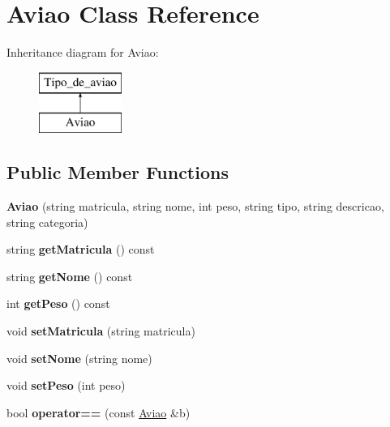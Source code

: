 \hypertarget{class_aviao}{
\section{Aviao Class Reference}
\label{class_aviao}
}
Inheritance diagram for Aviao:\begin{figure}[H]
\begin{center}
\leavevmode
\includegraphics[height=2.000000cm]{class_aviao}
\end{center}
\end{figure}
\subsection*{Public Member Functions}
\begin{DoxyCompactItemize}
\item 
\hypertarget{class_aviao_a5df6f09b98334b6a17c11d2bc78ef5f3}{
{\bfseries Aviao} (string matricula, string nome, int peso, string tipo, string descricao, string categoria)}
\label{class_aviao_a5df6f09b98334b6a17c11d2bc78ef5f3}

\item 
\hypertarget{class_aviao_ab61ad91be0cfc72e29dd06504cfb7089}{
string {\bfseries getMatricula} () const }
\label{class_aviao_ab61ad91be0cfc72e29dd06504cfb7089}

\item 
\hypertarget{class_aviao_a922ff675728d611ba5a503fbf9d70950}{
string {\bfseries getNome} () const }
\label{class_aviao_a922ff675728d611ba5a503fbf9d70950}

\item 
\hypertarget{class_aviao_ad868ba73a4442226f726ca3f3d29aab0}{
int {\bfseries getPeso} () const }
\label{class_aviao_ad868ba73a4442226f726ca3f3d29aab0}

\item 
\hypertarget{class_aviao_a3a77d059f6e62a7cbfbecaf49f8b83f2}{
void {\bfseries setMatricula} (string matricula)}
\label{class_aviao_a3a77d059f6e62a7cbfbecaf49f8b83f2}

\item 
\hypertarget{class_aviao_a28c60dfa9b6785d319af94ae413dc885}{
void {\bfseries setNome} (string nome)}
\label{class_aviao_a28c60dfa9b6785d319af94ae413dc885}

\item 
\hypertarget{class_aviao_a82a098d2fa5951a91edd1fb34dbf4ed8}{
void {\bfseries setPeso} (int peso)}
\label{class_aviao_a82a098d2fa5951a91edd1fb34dbf4ed8}

\item 
\hypertarget{class_aviao_a7204e9752252b3945d4ed74f677a06e1}{
bool {\bfseries operator==} (const \hyperlink{class_aviao}{Aviao} \&b)}
\label{class_aviao_a7204e9752252b3945d4ed74f677a06e1}

\end{DoxyCompactItemize}
